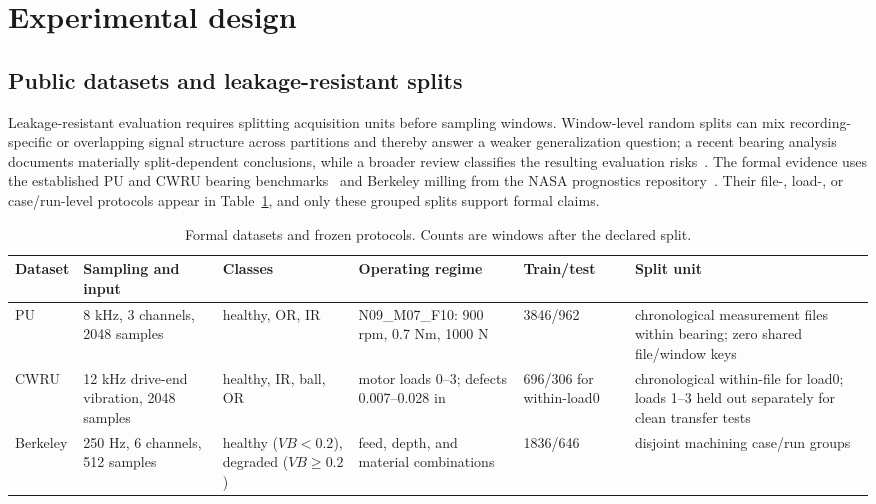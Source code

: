\documentclass[a4paper,fleqn]{cas-sc}
\newcommand{\pucond}{N09\_M07\_F10}
\begin{document}
\section{Experimental design}
\label{sec:setup}

\subsection{Public datasets and leakage-resistant splits}

Leakage-resistant evaluation requires splitting acquisition units before
sampling windows. Window-level random splits can mix recording-specific or
overlapping signal structure across partitions and thereby answer a weaker
generalization question; a recent bearing analysis documents materially
split-dependent conclusions, while a broader review classifies the resulting
evaluation risks~\citep{wheat2024vibrationleakage,kapoor2023leakage}. The formal evidence uses the established PU and CWRU bearing
benchmarks~\citep{lessmeier2016pu,smith2015cwru} and Berkeley milling from the
NASA prognostics repository~\citep{agogino2007milling}. Their file-, load-, or
case/run-level protocols appear in Table~\ref{tab:datasets}, and only these
grouped splits support formal claims.

\begin{table}[t]
\centering
\caption{Formal datasets and frozen protocols. Counts are windows after the
declared split.}
\label{tab:datasets}
\small
\setlength{\tabcolsep}{4pt}
\begin{tabular}{@{}p{1.4cm}p{2.0cm}p{2.2cm}p{2.8cm}p{1.7cm}p{3.5cm}@{}}
\toprule
Dataset & Sampling and input & Classes & Operating regime & Train/test & Split unit \\
\midrule
PU & 8 kHz, 3 channels, 2048 samples & healthy, OR, IR & \pucond: 900 rpm, 0.7 Nm, 1000 N & 3846/962 & chronological measurement files within bearing; zero shared file/window keys \\
CWRU & 12 kHz drive-end vibration, 2048 samples & healthy, IR, ball, OR & motor loads 0--3; defects 0.007--0.028 in & 696/306 for within-load0 & chronological within-file for load0; loads 1--3 held out separately for clean transfer tests \\
Berkeley & 250 Hz, 6 channels, 512 samples & healthy ($VB<0.2$), degraded ($VB\geq0.2$) & feed, depth, and material combinations & 1836/646 & disjoint machining case/run groups \\
\bottomrule
\end{tabular}
\end{table}
\end{document}

